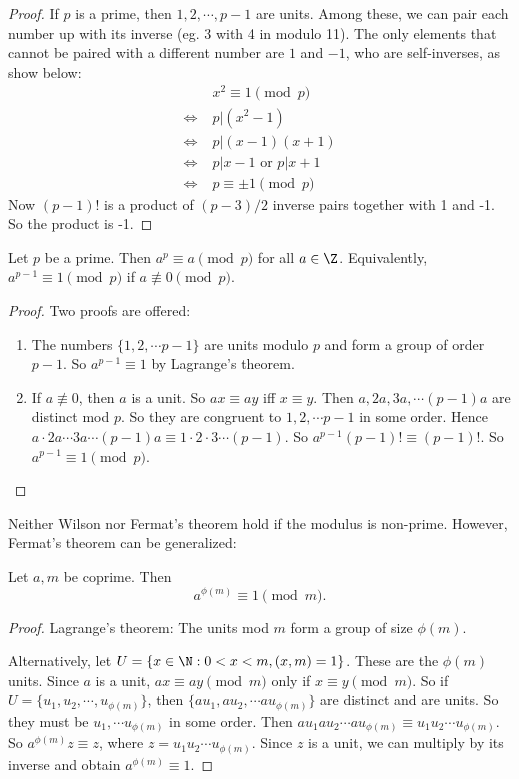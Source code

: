 \documentclass[a4paper]{article}
\begin{document}
\begin{proof}
  If $p$ is a prime, then $1, 2, \cdots, p - 1$ are units. Among these, we can pair each number up with its inverse (eg. 3 with 4 in modulo 11). The only elements that cannot be paired with a different number are $1$ and $-1$, who are self-inverses, as show below:
  \begin{align*}
    &\;x^2 \equiv 1\pmod p\\
    \Leftrightarrow&\; p | (x^2 - 1)\\
    \Leftrightarrow&\; p | (x - 1)(x + 1)\\
    \Leftrightarrow&\; p | x - 1 \text{ or } p | x + 1\\
    \Leftrightarrow&\; p \equiv \pm 1\pmod p
  \end{align*}
  Now $(p - 1)!$ is a product of $(p - 3)/2$ inverse pairs together with 1 and -1. So the product is -1.
\end{proof}

\begin{thm}
  Let $p$ be a prime. Then $a^p \equiv a\pmod p$ for all $a\in \Z$. Equivalently, $a^{p - 1}\equiv 1\pmod p$ if $a\not\equiv 0 \pmod p$.
\end{thm}

\begin{proof}
  Two proofs are offered:
  \begin{enumerate}
    \item The numbers $\{1, 2, \cdots p - 1\}$ are units modulo $p$ and form a group of order $p - 1$. So $a^{p - 1} \equiv 1$ by Lagrange's theorem.
    \item If $a\not\equiv 0$, then $a$ is a unit. So $ax \equiv ay$ iff $x\equiv y$. Then $a, 2a, 3a, \cdots (p - 1)a$ are distinct mod $p$. So they are congruent to $1, 2, \cdots p -1$ in some order. Hence $a\cdot 2a\cdots 3a\cdots (p - 1)a\equiv 1\cdot 2\cdot 3 \cdots (p - 1)$. So $a^{p - 1}(p - 1)! \equiv (p - 1)!$. So $a^{p - 1} \equiv 1\pmod p$.
  \end{enumerate}
\end{proof}
Neither Wilson nor Fermat's theorem hold if the modulus is non-prime. However, Fermat's theorem can be generalized:
\begin{thm}
  Let $a, m$ be coprime. Then
  \[
    a^{\phi(m)} \equiv 1\pmod m.
  \]
\end{thm}

\begin{proof}
  Lagrange's theorem: The units mod $m$ form a group of size $\phi(m)$.

  Alternatively, let $U = \{x\in \N: 0 < x < m, (x, m) = 1\}$. These are the $\phi(m)$ units. Since $a$ is a unit, $ax\equiv ay \pmod m$ only if $x\equiv y\pmod m$. So if $U = \{u_1, u_2, \cdots , u_{\phi(m)}\}$, then $\{au_1, au_2, \cdots au_{\phi(m)}\}$ are distinct and are units. So they must be $u_1, \cdots u_{\phi(m)}$ in some order. Then $au_1au_2\cdots au_{\phi(m)} \equiv u_1u_2\cdots u_{\phi(m)}$. So $a^{\phi(m)}z \equiv z$, where $z = u_1u_2\cdots u_{\phi(m)}$. Since $z$ is a unit, we can multiply by its inverse and obtain $a^{\phi(m)} \equiv 1$.
\end{proof}
\end{document}
